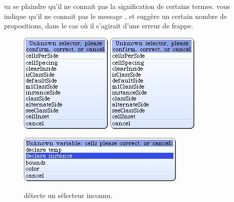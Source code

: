 \documentclass[a4paper,10pt,twoside]{book}
\begin{document}
\squeak va se plaindre qu'il ne connait pas la signification de certains termes.
\squeak vous indique qu'il ne connait pas le message , et suggère un certain nombre de propositions, dans le cas où il s'agirait d'une erreur de frappe.

\begin{figure}[htb]
\begin{minipage}{0.34\textwidth}
	\centering
	\ifluluelse
		{\includegraphics[width=\textwidth]{UnknownSelector}}
		{\includegraphics[scale=0.7]{UnknownSelector}}
	\caption{\squeak détecte un sélecteur inconnu.\label{fig:unknownSelector}}
\end{minipage}
\hfill
\begin{minipage}{0.64\textwidth}
	\centering
	\ifluluelse
		{\includegraphics[width=\textwidth]{DeclareInstanceVar}}

\end{minipage}
\end{figure}
\end{document}
